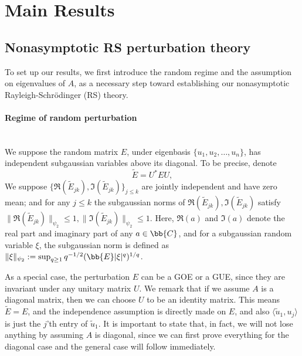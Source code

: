 \documentclass[12pt]{article}%
\theoremstyle{plain}%
\theoremstyle{remark}
\begin{document}

\section{Main Results}\label{sec::main}
\subsection{Nonasymptotic RS perturbation theory}\label{sec::nonasympRS}
To set up our results, we first introduce the random regime and the assumption on eigenvalues of $A$, as a necessary step toward establishing our nonasymptotic Rayleigh-Schr\"{o}dinger (RS) theory.
\paragraph{Regime of random perturbation} ~\\
We suppose the random matrix $E$, under eigenbasis $\{u_1, u_2,\ldots, u_n\}$, has independent subgaussian variables above its diagonal. To be precise,  denote
\begin{equation*}
\tilde{E} = U^* E U,
\end{equation*}
We suppose $\{ \Re(\tilde{E}_{jk}), \Im(\tilde{E}_{jk}) \}_{j \le k}$ are jointly independent and have zero mean; and for any $j \le k$ the subgaussian norms of $\Re(\tilde{E}_{jk}), \Im(\tilde{E}_{jk})$ satisfy $\| \Re(\tilde{E}_{jk}) \|_{\psi_2} \le 1, \| \Im(\tilde{E}_{jk}) \|_{\psi_2} \le 1$. Here, $\Re(a)$ and $\Im(a)$ denote the real part and imaginary part of any $a \in \bb{C}$, and for a subgaussian random variable $\xi$, the subgaussian norm is defined as $\| \xi \|_{\psi_2} := \sup_{q \ge 1} q^{-1/2} ( \bb{E} |\xi|^q )^{1/q}$.

As a special case, the perturbation $E$ can be a GOE or a GUE, since they are invariant under any unitary matrix $U$. We remark that if we assume $A$ is a diagonal matrix, then we can choose $U$ to be an identity matrix. This means $\tilde{E} = E$, and the independence assumption is directly made on $E$, and also $\langle \tilde{u}_1, u_j \rangle$ is just the $j$'th entry of $\tilde{u}_1$. It is important to state that, in fact, we will not lose anything by assuming $A$ is diagonal, since we can first prove everything for the diagonal case and the general case will follow immediately. 
\end{document}
